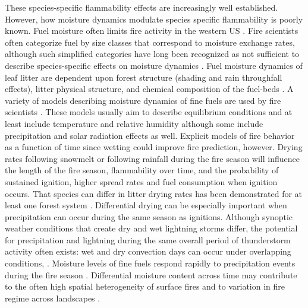 \documentclass[letterpaper,12pt]{article}
\begin{document}
These species-specific flammability effects are increasingly well established.
However, how moisture dynamics modulate species specific flammability is poorly
known. Fuel moisture often limits fire activity in the western US
\citep{Miller+Urban-1999, Parks+Parisien-2014}. Fire scientists often
categorize fuel by size classes that correspond to moisture exchange rates,
although such simplified categories have long been recognized as not sufficient
to describe species-specific effects on moisture dynamics
\citep{Anderson-1985}. Fuel moisture dynamics of leaf litter are dependent upon
forest structure (shading and rain throughfall effects), litter physical
structure, and chemical composition of the fuel-beds \citep{Nelson+Hiers-2008,
  Matthews-2014, Kreye_Hiers_etal-2018}. A variety of models describing
moisture dynamics of fine fuels are used by fire scientists \citep{Viney-1991,
  Nelson-2000, Catchpole+Catchpole+etal-2001}. These models usually aim to
describe equilibrium conditions and at least include temperature and relative
humidity although some include precipitation and solar radiation effects as
well. Explicit models of fire behavior as a function of time since wetting
could improve fire prediction, however. Drying rates following snowmelt or
following rainfall during the fire season will influence the length of the fire
season, flammability over time, and the probability of sustained ignition,
higher spread rates and fuel consumption when ignition occurs. That species can
differ in litter drying rates has been demonstrated for at least one forest
system \citep{Kreye+Varner+etal-2013}. Differential drying can be especially
important when precipitation can occur during the same season as ignitions.
Although synoptic weather conditions that create dry and wet lightning storms
differ, the potential for precipitation and lightning during the same overall
period of thunderstorm activity often exists: wet and dry convection days can
occur under overlapping conditions, \citep{Rorig+Ferguson-1999}. Moisture
levels of fine fuels respond rapidly to precipitation events during the fire
season \citep{Estes+Knapp+etal-2012}. Differential moisture content across time
may contribute to the often high spatial heterogeneity of surface fires
\citep{Hille+Stephens-2005, Knapp+Keeley-2006, Kreye_Hiers_etal-2018} and to
variation in fire regime across landscapes \citep{Stephens-2001}.
\end{document}
